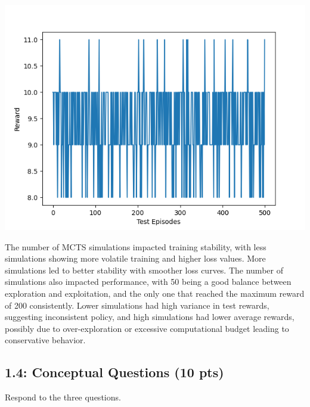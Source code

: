 \documentclass[12pt]{article}
\begin{document}
\begin{tcolorbox}[height=45em, width=\textwidth]
\begin{center}
\begin{minipage}{0.32\textwidth}
            \includegraphics[width=\textwidth]{outputs/plots/sim_100/testing/test_rewards.png}
        \end{minipage}    
    \end{center}

    The number of MCTS simulations impacted training stability, with less simulations showing more volatile training and higher loss values. More simulations led to better stability with smoother loss curves. The number of simulations also impacted performance, with 50 being a good balance between exploration and exploitation, and the only one that reached the maximum reward of 200 consistently. Lower simulations had high variance in test rewards, suggesting inconsistent policy, and high simulations had lower average rewards, possibly due to over-exploration or excessive computational budget leading to conservative behavior.
\end{tcolorbox}
\newpage


\subsection*{1.4: Conceptual Questions (10 pts)}
Respond to the three questions.

\begin{tcolorbox}[fit,height=45em, width=40em, blank, borderline={1pt}{1pt},nobeforeafter]
\begin{center}
\end{center}
\end{tcolorbox}
\end{document}

